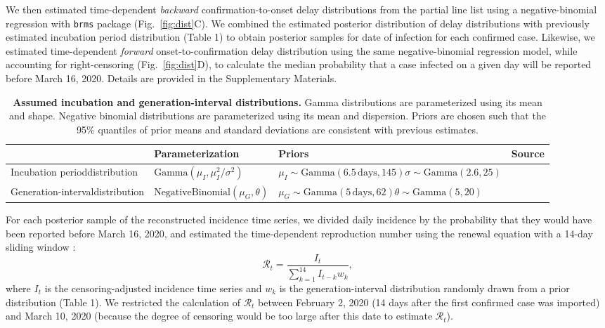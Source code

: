 \documentclass[12pt]{article}
\newcommand{\fref}[1]{Fig.~\ref{fig:#1}}
\begin{document}
We then estimated time-dependent \emph{backward} confirmation-to-onset delay distributions from the partial line list using a negative-binomial regression with \texttt{brms} package \citep{burkner2017brms} (\fref{dist}C).
We combined the estimated posterior distribution of delay distributions with previously estimated incubation period distribution (Table 1) to obtain posterior samples for date of infection for each confirmed case.
Likewise, we estimated time-dependent \emph{forward} onset-to-confirmation delay distribution using the same negative-binomial regression model, while accounting for right-censoring (\fref{dist}D),
to calculate the median probability that a case infected on a given day will be reported before March 16, 2020.
Details are provided in the Supplementary Materials.

\begin{table}[t]
\begin{center}
\small
\begin{tabular}{p{4cm}|p{4.5cm}|p{4.7cm}|l}
 & Parameterization & Priors & Source \\
\hline
Incubation period\newline distribution & $\mathrm{Gamma}(\mu_I, \mu_I^2/\sigma^2)$ & $\mu_I\sim \mathrm{Gamma}(6.5\,\textrm{days}, 145)$\newline$\sigma\sim \mathrm{Gamma}(2.6, 25)$ & \citep{backer2020incubation} \\
\hline
Generation-interval\newline distribution & $\mathrm{NegativeBinomial}(\mu_G, \theta)$ & $\mu_G\sim\mathrm{Gamma}(5\,\textrm{days},62)$\newline$\theta\sim\mathrm{Gamma}(5,20)$ & \citep{ferretti2020quantifying, ganyani2020estimating} \\
\hline
\end{tabular}
\end{center}
\caption{
\textbf{Assumed incubation and generation-interval distributions.}
Gamma distributions are parameterized using its mean and shape.
Negative binomial distributions are parameterized using its mean and dispersion.
Priors are chosen such that the 95\% quantiles of prior means and standard deviations are consistent with previous estimates.
}
\end{table}

For each posterior sample of the reconstructed incidence time series, we divided daily incidence by the probability that they would have been reported before March 16, 2020, and estimated the time-dependent reproduction number using the renewal equation with a 14-day sliding window \citep{fraser2007estimating}:
\begin{equation}
\mathcal R_t = \frac{I_t}{\sum_{k=1}^{14} I_{t-k} w_k},
\end{equation}
where $I_t$ is the censoring-adjusted incidence time series and $w_k$ is the generation-interval distribution randomly drawn from a prior distribution (Table 1).
We restricted the calculation of $\mathcal R_t$ between February 2, 2020 (14 days after the first confirmed case was imported) and March 10, 2020 (because the degree of censoring would be too large after this date to estimate $\mathcal R_t$).
\end{document}
